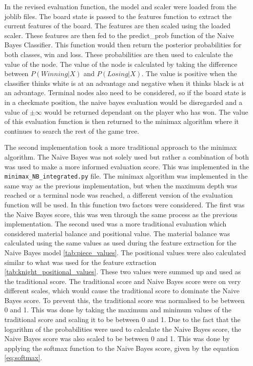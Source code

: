 In the revised evaluation function, the model and scaler were loaded from the joblib files. The board state is passed to the features function to extract the current features of the board. The features are then scaled using the loaded scaler. These features are then fed to the predict\_prob function of the Naive Bayes Classifier. This function would then return the posterior probabilities for both classes, win and loss. These probabilities are then used to calculate the value of the node. The value of the node is calculated by taking the difference between $P(Winning | X)$ and $P(Losing | X)$. The value is positive when the classifier thinks white is at an advantage and negative when it thinks black is at an advantage. Terminal nodes also need to be considered, so if the board state is in a checkmate position, the naive bayes evaluation would be disregarded and a value of $\pm \infty$ would be returned dependant on the player who has won. The value of this evaluation function is then returned to the minimax algorithm where it continues to search the rest of the game tree. 

The second implementation took a more traditional approach to the minimax algorithm. The Naive Bayes was not solely used but rather a combination of both was used to make a more informed evaluation score. This was implemented in the \texttt{minimax\_NB\_integrated.py} file. The minimax algorithm was implemented in the same way as the previous implementation, but when the maximum depth was reached or a terminal node was reached, a different version of the evaluation function will be used. In this function two factors were considered. The first was the Naive Bayes score, this was wen through the same process as the previous implementation. The second used was a more traditional evaluation which considered material balance and positional value. The material balance was calculated using the same values as used during the feature extraction for the Naive Bayes model \ref{tab:piece_values}. The positional values were also calculated similar to what was used for the feature extraction \ref{tab:knight_positional_values}. These two values were summed up and used as the traditional score. The traditional score and Naive Bayes score were on very different scales, which would cause the traditional score to dominate the Naive Bayes score. To prevent this, the traditional score was normalised to be between 0 and 1. This was done by taking the maximum and minimum values of the traditional score and scaling it to be between 0 and 1. Due to the fact that the logarithm of the probabilities were used to calculate the Naive Bayes score, the Naive Bayes score was also scaled to be between 0 and 1. This was done by applying the softmax function to the Naive Bayes score, given by the equation \ref{eq:softmax}. 


